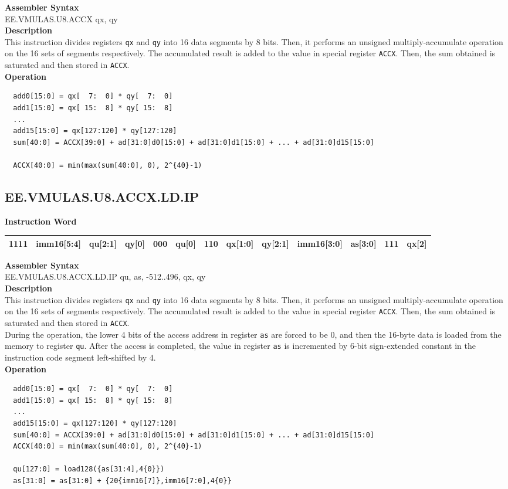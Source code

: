 \textbf{Assembler Syntax} \\
EE.VMULAS.U8.ACCX qx, qy \\
\textbf{Description} \\
This instruction divides registers \lstinline{qx} and \lstinline{qy} into 16 data segments by 8 bits. Then, it performs an unsigned multiply-accumulate operation on the 16 sets of segments respectively. The accumulated result is added to the value in special register \lstinline{ACCX}. Then, the sum obtained is saturated and then stored in \lstinline{ACCX}.\\
\textbf{Operation}
\begin{lstlisting}
  add0[15:0] = qx[  7:  0] * qy[  7:  0]
  add1[15:0] = qx[ 15:  8] * qy[ 15:  8]
  ...
  add15[15:0] = qx[127:120] * qy[127:120]
  sum[40:0] = ACCX[39:0] + ad[31:0]d0[15:0] + ad[31:0]d1[15:0] + ... + ad[31:0]d15[15:0]

  ACCX[40:0] = min(max(sum[40:0], 0), 2^{40}-1)
\end{lstlisting}

\clearpage
\subsection{EE.VMULAS.U8.ACCX.LD.IP}\label{instruction:EEVMULASU8ACCXLDIP}
\setlength\tabcolsep{6pt}
\textbf{Instruction Word} \\
\begin{tabular}{|c|c|c|c|c|c|c|c|c|c|c|c|c|}
	\hline
	1111 & imm16[5:4] & qu[2:1] & qy[0] & 000 & qu[0] & 110 & qx[1:0] & qy[2:1] & imm16[3:0] & as[3:0] & 111 & qx[2] \\
	\hline
\end{tabular}

\textbf{Assembler Syntax} \\
EE.VMULAS.U8.ACCX.LD.IP qu, as, -512..496, qx, qy \\
\textbf{Description} \\
This instruction divides registers \lstinline{qx} and \lstinline{qy} into 16 data segments by 8 bits. Then, it performs an unsigned multiply-accumulate operation on the 16 sets of segments respectively. The accumulated result is added to the value in special register \lstinline{ACCX}. Then, the sum obtained is saturated and then stored in \lstinline{ACCX}. \\ During the operation, the lower 4 bits of the access address in register \lstinline{as} are forced to be 0, and then the 16-byte data is loaded from the memory to register \lstinline{qu}. After the access is completed, the value in register \lstinline{as} is incremented by 6-bit sign-extended constant in the instruction code segment left-shifted by 4.\\
\textbf{Operation}
\begin{lstlisting}
  add0[15:0] = qx[  7:  0] * qy[  7:  0]
  add1[15:0] = qx[ 15:  8] * qy[ 15:  8]
  ...
  add15[15:0] = qx[127:120] * qy[127:120]
  sum[40:0] = ACCX[39:0] + ad[31:0]d0[15:0] + ad[31:0]d1[15:0] + ... + ad[31:0]d15[15:0]
  ACCX[40:0] = min(max(sum[40:0], 0), 2^{40}-1)

  qu[127:0] = load128({as[31:4],4{0}})
  as[31:0] = as[31:0] + {20{imm16[7]},imm16[7:0],4{0}}
\end{lstlisting}

